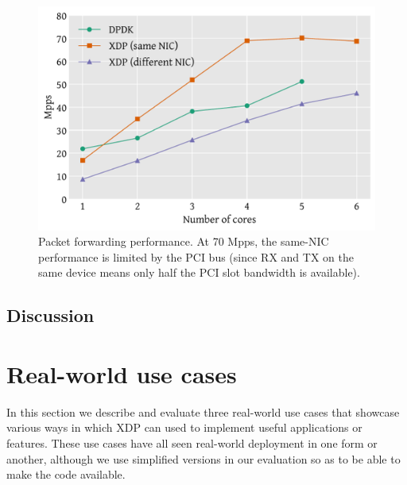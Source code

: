 \documentclass[10pt,sigconf]{acmart}
\begin{document}
\begin{figure}[t]
\centering
\includegraphics[width=\linewidth]{figures/redirect-test.pdf}
\caption{\label{fig:redirect-test} Packet forwarding performance. At 70 Mpps,
  the same-NIC performance is limited by the PCI bus (since RX and TX on the
  same device means only half the PCI slot bandwidth is available).}
\end{figure}

\subsection{Discussion}
\label{sec:perf-discussion}

%

\section{Real-world use cases}
\label{sec:usecases}
In this section we describe and evaluate three real-world use cases that
showcase various ways in which XDP can used to implement useful applications or
features. These use cases have all seen real-world deployment in one form or
another, although we use simplified versions in our evaluation so as to be able
to make the code available.
\end{document}
